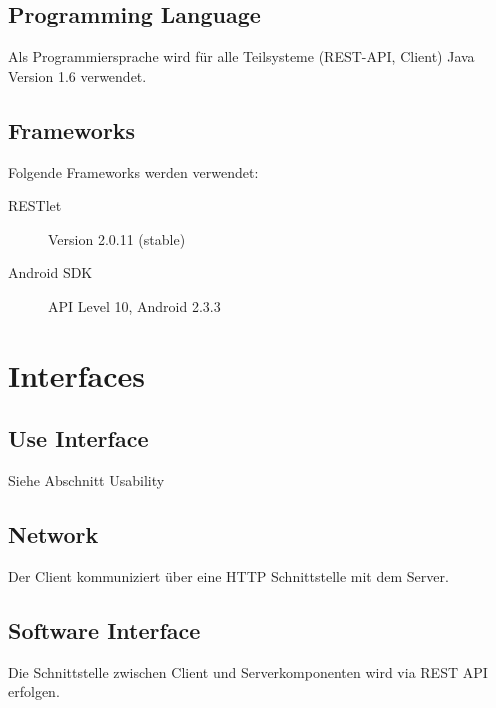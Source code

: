 \documentclass[10pt,a4paper]{scrartcl}
\begin{document}
	\subsection{Programming Language}

	Als Programmiersprache wird für alle Teilsysteme (REST-API, Client) Java Version 1.6 verwendet.

	\subsection{Frameworks}

	Folgende Frameworks werden verwendet:

	\begin{description}
		\item[RESTlet] Version 2.0.11 (stable)
		\item[Android SDK] API Level 10, Android 2.3.3 
	\end{description}

\section{Interfaces}
\subsection{Use Interface}
Siehe Abschnitt Usability
\subsection{Network}
Der Client kommuniziert über eine HTTP Schnittstelle mit dem Server.
\subsection{Software Interface}
Die Schnittstelle zwischen Client und Serverkomponenten wird via REST API erfolgen.


\end{document}
